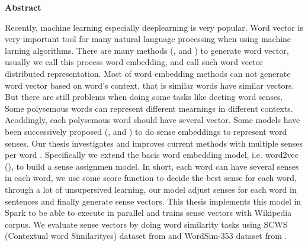 \thispagestyle{empty}

\centerline{\Large{\textbf{Abstract}}}

\vspace{2cm}

\noindent Recently, machine learning especially deeplearning is very popular. Word vector is very important tool for many natural language processing when using machine larning algorithms.  There are many methods (\citep{BengioDucharmeEtAl2003},\citep{CollobertWeston2008} and \citep{MikolovSutskeverEtAl2013}) to generate word vector, usually we call this process word embedding, and call such word vector distributed representation. Most of word embedding methods can not generate word vector based on word's context, that is similar words have similar vectors. But there are still problems when doing some tasks like decting word senses. Some polysemous words can represent different mearnings in different contexts. Acoddingly, each polysemous word should have several vector. Some models have been successively proposed (\citep{HuangSocherEtAl2012},\citep{TianDaiEtAl2014} and \citep{NeelakantanShankarEtAl2015}) to do sense embeddings to represent word senses. Our thesis investigates and improves current methods with multiple senses per word . Specifically  we extend the bacis word embedding model, i.e. word2vec (\citep{MikolovSutskeverEtAl2013}), to build a sense assignmen model. In short, each word can have several senses in each word, we use some score function to decide the best sense for each word, through a lot of unsupersived learning, our model adjust senses for each word in sentences and finally generate sense vectors. This thesis implements this model in Spark to be able to execute in parallel and trains sense vectors with Wikipedia corpus. We evaluate sense vectors by doing word similarity tasks using SCWS (Contextual word Similarityes) dataset from \citep{HuangSocherEtAl2012} and WordSim-353 dataset from \citep{FinkelsteinGabrilovichEtAl2001} . 

\newpage
\thispagestyle{empty}
\rule{0cm}{5cm}